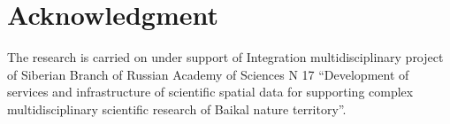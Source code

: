 \documentclass[conference]{IEEEtran}
\begin{document}
\section*{Acknowledgment}
The research is carried on under support of Integration multidisciplinary project of Siberian Branch of Russian Academy of Sciences N 17 ``Development of services and infrastructure of scientific spatial data for supporting complex multidisciplinary scientific research of Baikal nature territory''.



\end{document}
